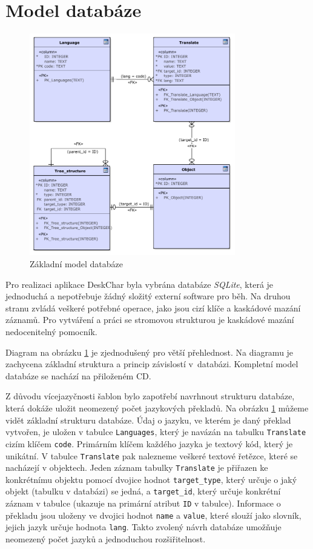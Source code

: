 \documentclass[thesis=B,czech]{resources/FITthesis}[2012/06/26]
\begin{document}
	\section{Model databáze}
	\begin{figure}\centering
	\includegraphics[width=0.8\textwidth]{images/basic_database}
	\caption[Základní model databáze]{Základní model databáze}\label{fig:db_basic}
	\end{figure}
	Pro realizaci aplikace DeskChar byla vybrána databáze \textit{SQLite}, která je jednoduchá a nepotřebuje žádný složitý externí software pro běh. Na druhou stranu zvládá veškeré potřebné operace, jako jsou cizí klíče a kaskádové mazání záznamů. Pro vytváření a práci se stromovou strukturou je kaskádové mazání nedocenitelný pomocník. \par

Diagram na obrázku \ref{fig:db_basic} je zjednodušený pro větší přehlednost. Na diagramu je zachycena základní struktura a princip závislostí v~databázi. Kompletní model databáze se nachází na přiloženém CD.\par

Z důvodu vícejazyčnosti šablon bylo zapotřebí navrhnout strukturu databáze, která dokáže uložit neomezený počet jazykových překladů. Na obrázku \ref{fig:db_basic} můžeme vidět základní strukturu databáze. Údaj o jazyku, ve kterém je daný překlad vytvořen, je uložen v tabulce \texttt{Languages}, který je navázán na tabulku \texttt{Translate} cizím klíčem \texttt{code}. Primárním klíčem každého jazyka je textový kód, který je unikátní. V tabulce \texttt{Translate} pak nalezneme veškeré textové řetězce, které se nacházejí v objektech. Jeden záznam tabulky \texttt{Translate} je přiřazen ke konkrétnímu objektu pomocí dvojice hodnot \texttt{target\_type}, který určuje o jaký objekt (tabulku v databázi) se jedná, a \texttt{target\_id}, který určuje konkrétní záznam v tabulce (ukazuje na primární atribut \texttt{ID} v tabulce). Informace o překladu jsou uloženy ve dvojici hodnot \texttt{name} a \texttt{value}, které slouží jako slovník, jejich jazyk určuje hodnota \texttt{lang}. Takto zvolený návrh databáze umožňuje neomezený počet jazyků a jednoduchou rozšiřitelnost.\par
\end{document}
